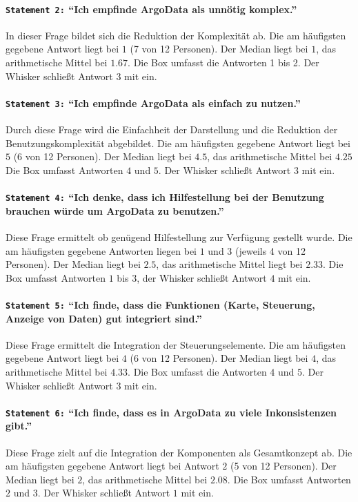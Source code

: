  \paragraph{\texttt{Statement 2:} "`Ich empfinde ArgoData als unnötig komplex."'}
    In dieser Frage bildet sich die Reduktion der Komplexität ab.
    Die am häufigsten gegebene Antwort liegt bei $1$ (7 von 12 Personen).  Der Median liegt bei $1$, das arithmetische Mittel bei $1.67$. Die Box umfasst die Antworten 1 bis 2. Der Whisker schließt Antwort $3$ mit ein.

  \paragraph{\texttt{Statement 3:} "`Ich empfinde ArgoData als einfach zu nutzen."'}
    Durch diese Frage wird die Einfachheit der Darstellung und die Reduktion der Benutzungskomplexität abgebildet. Die am häufigsten gegebene Antwort liegt bei $5$ (6 von 12 Personen). Der Median liegt bei $4.5$, das arithmetische Mittel bei $4.25$   Die Box umfasst Antworten $4$ und $5$. Der Whisker schließt Antwort $3$ mit ein.

\paragraph{\texttt{Statement 4:} "`Ich denke, dass ich Hilfestellung bei der Benutzung brauchen würde um ArgoData zu benutzen."'}
    Diese Frage ermittelt ob genügend Hilfestellung zur Verfügung gestellt wurde.  Die am häufigsten gegebene Antworten liegen bei $1$ und $3$ (jeweils 4 von 12 Personen).  Der Median liegt bei $2.5$, das arithmetische Mittel liegt bei $2.33$. Die Box umfasst Antworten $1$ bis $3$, der Whisker schließt Antwort $4$ mit ein.

\paragraph{\texttt{Statement 5:} "`Ich finde, dass die Funktionen (Karte, Steuerung, Anzeige von Daten) gut integriert sind."'}
    Diese Frage ermittelt die Integration der Steuerungselemente.
    Die am häufigsten gegebene Antwort liegt bei $4$ (6 von 12 Personen). Der Median liegt bei $4$, das arithmetische Mittel bei $4.33$. Die Box umfasst  die Antworten $4$ und $5$. Der Whisker schließt Antwort $3$ mit ein.

\paragraph{\texttt{Statement 6:} "`Ich finde, dass es in ArgoData zu viele Inkonsistenzen gibt."'}
    Diese Frage zielt auf die Integration der Komponenten als Gesamtkonzept ab. Die am häufigsten gegebene Antwort liegt bei Antwort $2$ (5 von 12 Personen). Der Median liegt bei $2$, das arithmetische Mittel bei $2.08$. Die Box umfasst Antworten $2$ und $3$. Der Whisker schließt Antwort $1$ mit ein.

